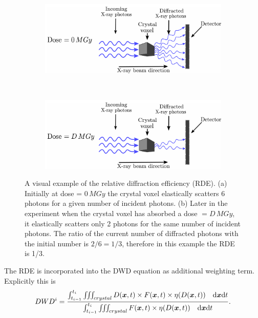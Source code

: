 \begin{figure}
        \centering
        \begin{subfigure}[b]{1\textwidth}
                \centering
                \includegraphics[width=\textwidth]{figures/dwd/rde1.pdf}
                \caption{}
                \label{fig:Graphical depiction of RDE - 0 MGy}
        \end{subfigure}
				\\
        \begin{subfigure}[b]{1\textwidth}
                \centering
                \includegraphics[width=\textwidth]{figures/dwd/rde2.pdf}
                \caption{}
                \label{fig:Graphical depiction of RDE - D MGy}
        \end{subfigure}
        \caption{A visual example of the relative diffraction efficiency (RDE).
        (a) Initially at dose = $0\, MGy$ the crystal voxel elastically scatters 6 photons for a given number of incident photons.
        (b) Later in the experiment when the crystal voxel has absorbed a dose $= D\, MGy$, it elastically scatters only 2 photons for the same number of incident photons.
        The ratio of the current number of diffracted photons with the initial number is $2/6 = 1/3$, therefore in this example the RDE is 1/3.}
        \label{fig: Graphical depiction of RDE}
\end{figure}

The RDE is incorporated into the DWD equation as additional weighting term.
Explicitly this is
\begin{equation}
    DWD^i = \frac{\int_{t_{i-1}}^{t_{i}} \iiint_{crystal} D(\boldsymbol{x},t) \times F(\boldsymbol{x},t) \times \eta(D(\boldsymbol{x},t)) \quad \mathrm{d}\boldsymbol{x}\mathrm{d} t}{\int_{t_{i-1}}^{t_{i}} \iiint_{crystal}F(\boldsymbol{x},t) \times \eta(D(\boldsymbol{x},t)) \quad \mathrm{d}\boldsymbol{x}\mathrm{d} t}.
    \label{eq:DWD equation with RDE}
\end{equation}

